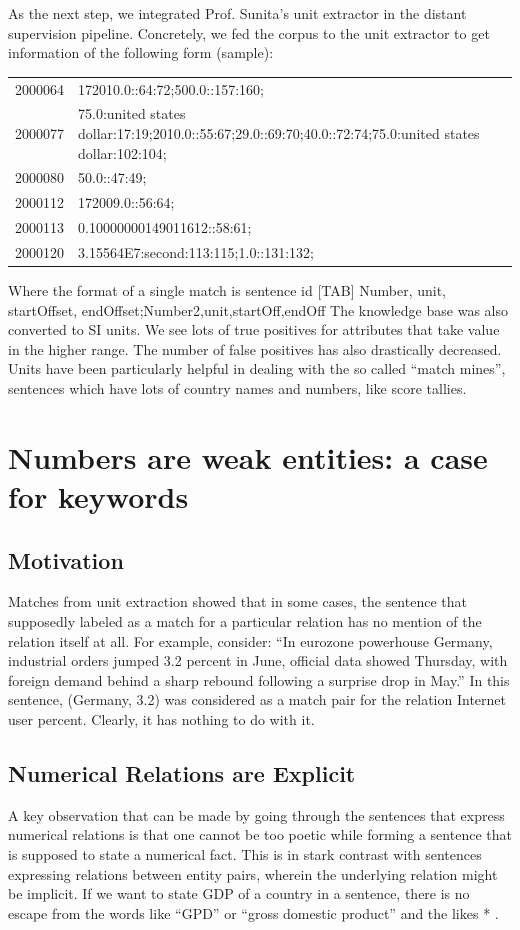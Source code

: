\documentclass[a4paper,10pt]{article}
\begin{document}
As the next step, we integrated Prof. Sunita's unit extractor in the distant supervision pipeline.
Concretely, we fed the corpus to the unit extractor to get information of the following form
(sample):
\begin{tabular}{ll}
 \hline
2000064&172010.0::64:72;500.0::157:160;\\
2000077&75.0:united states dollar:17:19;2010.0::55:67;29.0::69:70;40.0::72:74;75.0:united
states dollar:102:104;\\
2000080&50.0::47:49;\\
2000112&172009.0::56:64;\\
2000113&0.10000000149011612::58:61;\\
2000120&3.15564E7:second:113:115;1.0::131:132;\\
\end{tabular}

Where the format of a single match is sentence id [TAB] Number, unit, startOffset, endOffset;Number2,unit,startOff,endOff
The knowledge base was also converted to SI units.
We see lots of true positives for attributes that take value in the higher range. The number of false
positives has also drastically decreased. Units have been particularly helpful in dealing with the so
called “match mines”, sentences which have lots of country names and numbers, like score tallies.

\section{Numbers are weak entities: a case for keywords}

\subsection{Motivation}
Matches from unit extraction showed that in some cases, the sentence that supposedly labeled as a
match for a particular relation has no mention of the relation itself at all.
For example, consider:
“In eurozone powerhouse Germany, industrial orders jumped 3.2 percent in June, official data
showed Thursday, with foreign demand behind a sharp rebound following a surprise drop in May.”
In this sentence, (Germany, 3.2) was considered as a match pair for the relation Internet user
percent. Clearly, it has nothing to do with it.

\subsection{Numerical Relations are Explicit}
A key observation that can be made by going through the sentences that express numerical relations
is that one cannot be too poetic while forming a sentence that is supposed to state a numerical fact.
This is in stark contrast with sentences expressing relations between entity pairs, wherein the
underlying relation might be implicit. If we want to state GDP of a country in a sentence, there is no
escape from the words like “GPD” or “gross domestic product” and the likes * .
\end{document}
